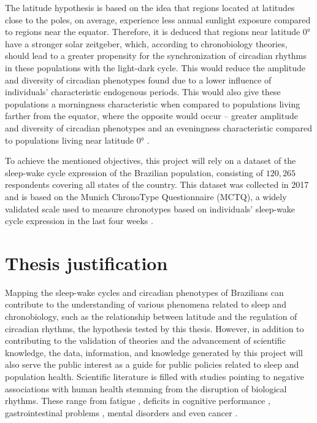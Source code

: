 \documentclass[
12pt,
openright,
oneside,
a4paper,
chapter=TITLE,
section=TITLE,
french,
spanish,
brazil,
english
]{abntex2}\usepackage{array}
\begin{document}
The latitude hypothesis is based on the idea that regions located at
latitudes close to the poles, on average, experience less annual
sunlight exposure compared to regions near the equator. Therefore, it is
deduced that regions near latitude 0° have a stronger solar zeitgeber,
which, according to chronobiology theories, should lead to a greater
propensity for the synchronization of circadian rhythms in these
populations with the light-dark cycle. This would reduce the amplitude
and diversity of circadian phenotypes found due to a lower influence of
individuals' characteristic endogenous periods. This would also give
these populations a morningness characteristic when compared to
populations living farther from the equator, where the opposite would
occur -- greater amplitude and diversity of circadian phenotypes and an
eveningness characteristic compared to populations living near latitude
0° \autocite{roenneberg2003}.

To achieve the mentioned objectives, this project will rely on a dataset
of the sleep-wake cycle expression of the Brazilian population,
consisting of \(120,265\) respondents covering all states of the
country. This dataset was collected in 2017 and is based on the Munich
ChronoType Questionnaire (MCTQ), a widely validated scale used to
measure chronotypes based on individuals' sleep-wake cycle expression in
the last four weeks \autocite{roenneberg2003,roenneberg2012a}.

\section{Thesis justification}\label{thesis-justification}

Mapping the sleep-wake cycles and circadian phenotypes of Brazilians can
contribute to the understanding of various phenomena related to sleep
and chronobiology, such as the relationship between latitude and the
regulation of circadian rhythms, the hypothesis tested by this thesis.
However, in addition to contributing to the validation of theories and
the advancement of scientific knowledge, the data, information, and
knowledge generated by this project will also serve the public interest
as a guide for public policies related to sleep and population health.
Scientific literature is filled with studies pointing to negative
associations with human health stemming from the disruption of
biological rhythms. These range from fatigue \autocite{tryon2004},
deficits in cognitive performance \autocite{dongen2003} ,
gastrointestinal problems \autocite{fido2008,morito2014,mortas2020},
mental disorders \autocite{jones2005,kalmbach2015,roh2012} and even
cancer \autocite{lie2006,papantoniou2015,schernhammer2001}.
\end{document}

